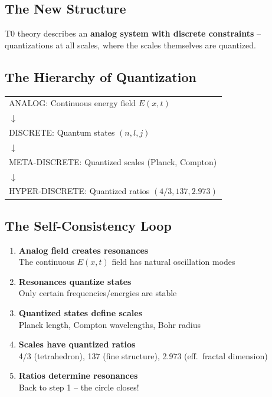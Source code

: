 	\subsection{The New Structure}
	
	T0 theory describes an \textbf{analog system with discrete constraints} -- quantizations at all scales, where the scales themselves are quantized.
	
	\subsection{The Hierarchy of Quantization}
	
	\begin{center}
		\begin{tabular}{l}
			ANALOG: Continuous energy field $E(x,t)$\\
			$\downarrow$\\
			DISCRETE: Quantum states $(n, l, j)$\\
			$\downarrow$\\
			META-DISCRETE: Quantized scales (Planck, Compton)\\
			$\downarrow$\\
			HYPER-DISCRETE: Quantized ratios $(4/3, 137, 2.973)$
		\end{tabular}
	\end{center}
	
	\subsection{The Self-Consistency Loop}
	
	\begin{enumerate}
		\item \textbf{Analog field creates resonances}\\
		The continuous $E(x,t)$ field has natural oscillation modes
		
		\item \textbf{Resonances quantize states}\\
		Only certain frequencies/energies are stable
		
		\item \textbf{Quantized states define scales}\\
		Planck length, Compton wavelengths, Bohr radius
		
		\item \textbf{Scales have quantized ratios}\\
		4/3 (tetrahedron), 137 (fine structure), 2.973 (eff.\ fractal dimension)
		
		\item \textbf{Ratios determine resonances}\\
		Back to step 1 -- the circle closes!
	\end{enumerate}
	
